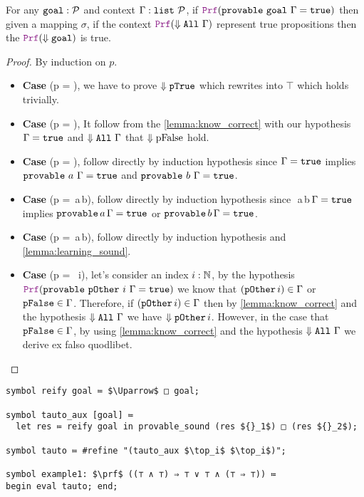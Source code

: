 \begin{theorem}
For any $\texttt{\upshape{goal}}: \mathcal{P}$ and context $\Gamma: \texttt{list}~\mathcal{P}$, if $\prf (\kw{provable}~\kw{goal}~\hyps = \true)$
then given a mapping $\sigma$, if the context $\prf (\deno{\kw{All}~\hyps})$ represent true propositions then the $\prf (\deno{\kw{goal}})$ is true.
\begin{proof} By induction on $p$.
\begin{itemize}
\item[] \textbf{Case} (p = ), we have to prove $\Downarrow \texttt{\upshape{pTrue}}$ which rewrites into $\top$ which holds trivially.
\item[] \textbf{Case} (p = ), It follow from the \cref{lemma:know_correct} with our hypothesis   $\Gamma = \texttt{\upshape{true}}$ and $\Downarrow \texttt{\upshape{All}}~\Gamma$ that $\Downarrow \text{pFalse}$ hold.
\item[] \textbf{Case} (p = ), follow directly by induction hypothesis since   $\Gamma = \texttt{\upshape{true}}$ implies $\texttt{\upshape{provable}}~a~\Gamma = \texttt{\upshape{true}}$ and $\texttt{\upshape{provable}}~b~\Gamma = \texttt{\upshape{true}}$.
\item[] \textbf{Case} (p = \,a\,b), follow directly by induction hypothesis since \,\,a\,b\,$\Gamma = \texttt{\upshape{true}}$ implies $\texttt{\upshape{provable}}\,a\,\Gamma = \texttt{\upshape{true}}$ or $\texttt{\upshape{provable}}\,b\,\Gamma = \texttt{\upshape{true}}$.
\item[] \textbf{Case} (p = \,a\,b), follow directly by induction hypothesis and \cref{lemma:learning_sound}.
\item[] \textbf{Case} (p = ~i), let's consider an index $i: \mathbb{N}$, by the hypothesis $\prf (\kw{provable}~\kw{pOther}~i~\hyps = \true)$  we know that $(\texttt{\upshape{pOther}}\,i) \in \Gamma$ or $\texttt{\upshape{pFalse}} \in \Gamma$. Therefore,
if $(\texttt{\upshape{pOther}}\,i) \in \Gamma$ then by \cref{lemma:know_correct} and the hypothesis $\Downarrow \texttt{\upshape{All}}~\Gamma$ we have $\Downarrow \texttt{\upshape{pOther}}\,i$. However,
in the case that $\texttt{\upshape{pFalse}} \in \Gamma$, by using \cref{lemma:know_correct} and the hypothesis $\Downarrow \texttt{\upshape{All}}~\Gamma$ we derive ex falso quodlibet.
\end{itemize}
\end{proof}
\end{theorem}

\begin{lstlisting}[mathescape=true, language=Lambdapi, caption={Usage of Tauto}, label={lst:tauto-ex}]
symbol reify goal ≔ $\Uparrow$ □ goal;

symbol tauto_aux [goal] ≔
  let res ≔ reify goal in provable_sound (res ${}_1$) □ (res ${}_2$);

symbol tauto ≔ #refine "(tauto_aux $\top_i$ $\top_i$)";

symbol example1: $\prf$ ((⊤ ∧ ⊤) ⇒ ⊤ ∨ ⊤ ∧ (⊤ ⇒ ⊤)) ≔
begin eval tauto; end;
\end{lstlisting}

